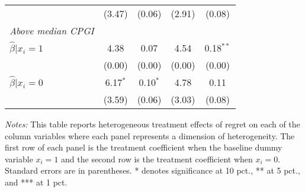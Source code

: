 \begin{table}[htbp]
{\begin{threeparttable}
\begin{tabular}{l*{4}{c}}
                &   (3.47)&   (0.06)&   (2.91)&   (0.08)\\
\textit{Above median CPGI}&         &         &         &         \\
\hspace{0.5cm} \(\hat\beta|x_i=1\)&     4.38&     0.07&     4.54&0.18$^{**}$\\
                &   (0.00)&   (0.00)&   (0.00)&   (0.00)\\
\hspace{0.5cm} \(\hat\beta|x_i=0\)&6.17$^{*}$&0.10$^{*}$&     4.78&     0.11\\
                &   (3.59)&   (0.06)&   (3.03)&   (0.08)\\
\bottomrule \end{tabular} \begin{tablenotes}[flushleft] \footnotesize \item \emph{Notes:} This table reports heterogeneous treatment effects of regret on each of the column variables where each panel represents a dimension of heterogeneity. The first row of each panel is the treatment coefficient when the baseline dummy variable \(x_i = 1\) and the second row is the treatment coefficient when \(x_i = 0\). Standard errors are in parentheses. * denotes significance at 10 pct., ** at 5 pct., and *** at 1 pct. \end{tablenotes} \end{threeparttable} } \end{table}
